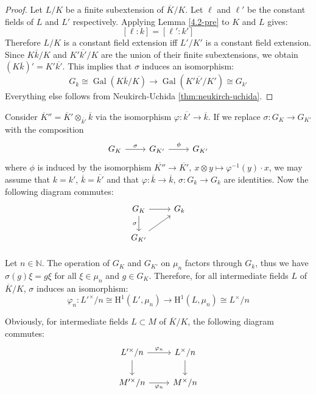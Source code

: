 \begin{proof}
Let $L/K$ be a finite subextension of $\overline{K}/K$. Let $\ell$ and $\ell'$ be the constant fields of $L$ and $L'$ respectively. Applying Lemma \ref{4.2-pre} to $K$ and $L$ gives:
\[ [\ell:k] = [\ell':k'] \]
Therefore $L/K$ is a constant field extension iff $L'/K'$ is a constant field extension. Since $K\overline{k}/K$ and $K'\overline{k'}/K$ are the union of their finite subextensions, we obtain $(K\overline{k})' = K'\overline{k'}$. This implies that $\sigma$ induces an isomorphism:
\[G_k \cong \operatorname{Gal}(K\overline{k}/K) \to \operatorname{Gal}(K'\overline{k'}/K')\cong G_{k'}\] 
Everything else follows from Neukirch-Uchida \ref{thm:neukirch-uchida}.
\end{proof}

\begin{remark}
Consider $\overline{K}'' = \overline{K}'\otimes_{\overline{k'}}\overline{k}$ via the isomorphism $\varphi: \overline{k'}\to \overline{k}$. If we replace $\sigma: G_K\to G_{K'}$ with the composition
\[ \begin{tikzcd}
G_K \ar[r, "\sigma"] & G_{K'} \ar[r, "\phi"] & G_{K'}
\end{tikzcd} \]
where $\phi$ is induced by the isomorphism $\overline{K''}\to\overline{K'},\ x\otimes y\mapsto \varphi^{-1}(y)\cdot x$, we may assume that $k=k'$, $\overline{k} = \overline{k'}$ and that $\varphi:\overline{k}\to\overline{k}$, $\sigma: G_k\to G_k$ are identities. Now the following diagram commutes:
\[ \begin{tikzcd}
G_K \ar[r]\ar[d, "\sigma"'] & G_k\\
G_{K'}\ar[ru]
\end{tikzcd} \]
\end{remark}

\paragraph{} Let $n\in\mathbb{N}$. The operation of $G_K$ and $G_{K'}$ on $\mu_n$ factors through $G_k$, thus we have $\sigma(g)\xi = g\xi$ for all $\xi\in\mu_n$ and $g\in G_K$. Therefore, for all intermediate fields $L$ of $\overline{K}/K$, $\sigma$ induces an isomorphism:
\[ \varphi_n:L'^\times/n \cong\mathrm{H}^1(L', \mu_n) \to \mathrm{H}^1(L,\mu_n) \cong L^\times/n \]

\begin{remark}\label{remark-localphi-extension}
Obviously, for intermediate fields $L\subset M$ of $\overline{K}/K$, the following diagram commutes:
\[ \begin{tikzcd}
L'^\times/n \ar[r, "\varphi_n"]\dar & L^\times/n \dar\\
M'^\times/n \ar[r, "\varphi_n"'] & M^\times/n
\end{tikzcd} \]
\end{remark}

